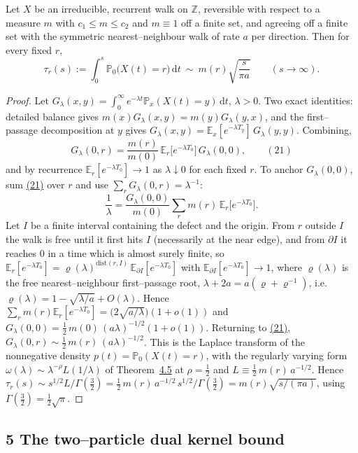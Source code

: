 \documentclass[11pt]{article}
\theoremstyle{plain}
\theoremstyle{definition}
\theoremstyle{remark}
\newcommand{\Z}{\mathbb{Z}}\newcommand{\R}{\mathbb{R}}\newcommand{\N}{\mathbb{N}}
\newcommand{\E}{\mathbb{E}}\newcommand{\PP}{\mathbb{P}}\newcommand{\dd}{\,\mathrm{d}}
\begin{document}
Let $X$ be an irreducible, recurrent walk on $\Z$, reversible with respect to a
measure $m$ with $c_1\le m\le c_2$ and $m\equiv1$ off a finite set, and agreeing off a
finite set with the symmetric nearest--neighbour walk of rate $a$ per direction. Then
for every fixed $r$,
\[
  \tau_r(s):=\int_0^s\PP_0\big(X(t)=r\big)\dd t\ \sim\ m(r)\sqrt{\frac{s}{\pi a}}
  \qquad(s\to\infty).
\]
\par
\begin{proof}
Let $G_\lambda(x,y)=\int_0^\infty e^{-\lambda t}\PP_x(X(t)=y)\dd t$, $\lambda>0$. Two
exact identities: detailed balance gives $m(x)G_\lambda(x,y)=m(y)G_\lambda(y,x)$, and
the first--passage decomposition at $y$ gives
$G_\lambda(x,y)=\E_x[e^{-\lambda T_y}]\,G_\lambda(y,y)$. Combining,
\label{eq_Gid}
\begin{equation}
  G_\lambda(0,r)=\frac{m(r)}{m(0)}\,\E_r\big[e^{-\lambda T_0}\big]\,G_\lambda(0,0),\qquad(21)
\end{equation}
and by recurrence $\E_r[e^{-\lambda T_0}]\to1$ as $\lambda\downarrow0$ for each fixed
$r$. To anchor $G_\lambda(0,0)$, sum \hyperref[eq_Gid]{(21)} over $r$ and use
$\sum_rG_\lambda(0,r)=\lambda^{-1}$:
\[
  \frac1\lambda=\frac{G_\lambda(0,0)}{m(0)}\sum_r m(r)\,\E_r\big[e^{-\lambda T_0}\big].
\]
Let $I$ be a finite interval containing the defect and the origin. From $r$ outside
$I$ the walk is free until it first hits $I$ (necessarily at the near edge), and from
$\partial I$ it reaches $0$ in a time which is almost surely finite, so
$\E_r[e^{-\lambda T_0}]=\varrho(\lambda)^{\mathrm{dist}(r,I)}\,
\E_{\partial I}[e^{-\lambda T_0}]$ with $\E_{\partial I}[e^{-\lambda T_0}]\to1$, where
$\varrho(\lambda)$ is the free nearest--neighbour first--passage root,
$\lambda+2a=a(\varrho+\varrho^{-1})$, i.e.\
$\varrho(\lambda)=1-\sqrt{\lambda/a}+O(\lambda)$. Hence
$\sum_rm(r)\E_r[e^{-\lambda T_0}]=\big(2\sqrt{a/\lambda}\big)(1+o(1))$ and
$G_\lambda(0,0)=\tfrac12\,m(0)\,(a\lambda)^{-1/2}(1+o(1))$. Returning to
\hyperref[eq_Gid]{(21)}, $G_\lambda(0,r)\sim\tfrac12\,m(r)\,(a\lambda)^{-1/2}$. This is the
Laplace transform of the nonnegative density $p(t)=\PP_0(X(t)=r)$, with the regularly
varying form $\omega(\lambda)\sim\lambda^{-\rho}L(1/\lambda)$ of
Theorem~\hyperref[thm_karamata]{4.5} at $\rho=\tfrac12$ and $L\equiv\tfrac12\,m(r)\,a^{-1/2}$.
Hence $\tau_r(s)\sim s^{1/2}L/\Gamma(\tfrac32)=\tfrac12\,m(r)\,a^{-1/2}\,s^{1/2}/\Gamma(\tfrac32)
=m(r)\sqrt{s/(\pi a)}$, using $\Gamma(\tfrac32)=\tfrac12\sqrt\pi$.
\end{proof}

\subsection{5 The two--particle dual kernel bound}\label{sec_kernel}
\end{document}
